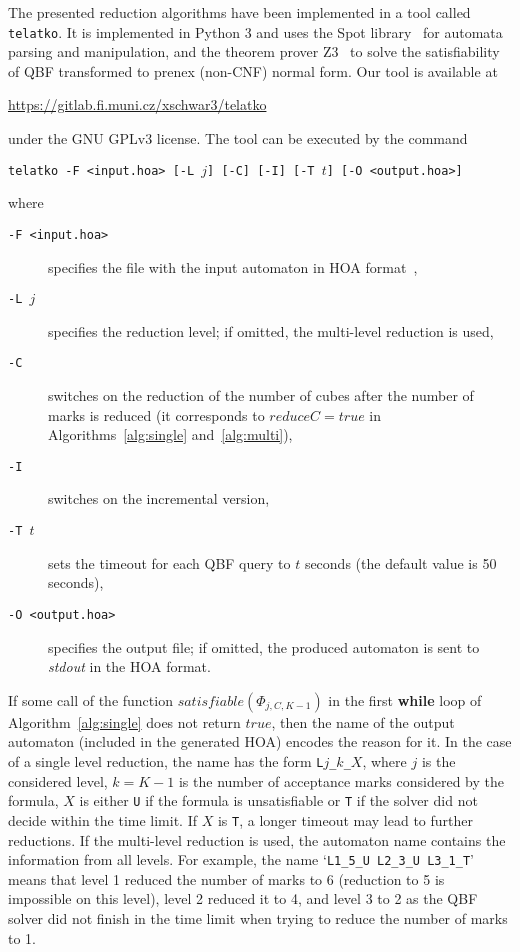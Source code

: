 \documentclass[a4paper,UKenglish,cleveref,autoref,thm-restate]{lipics-v2021}
\def\true{\mathit{true}}
\newcommand{\telatko}{\texttt{telatko}\xspace}
\begin{document}
The presented reduction algorithms have been implemented in a tool
called \telatko. It is implemented in Python 3 and uses the Spot
library~\cite{duret.16.atva2} for automata parsing and manipulation,
and the theorem prover Z3~\cite{demoura.08.tacas} to solve the
satisfiability of QBF transformed to prenex (non-CNF) normal form. Our
tool is available at
\begin{center}
\url{https://gitlab.fi.muni.cz/xschwar3/telatko}
\end{center}
under the GNU GPLv3
license. The tool can be executed by the command 
\begin{center}
  \texttt{telatko -F <input.hoa> [-L }$j$\texttt{] [-C] [-I] [-T }$t$\texttt{] [-O <output.hoa>]}
\end{center}
where
\begin{description}
\item[\texttt{-F <input.hoa>}] specifies the file with the input automaton in HOA format~\cite{babiak.15.cav}, 
\item[\texttt{-L }$j$] specifies the reduction level; if omitted, the multi-level reduction is used,
\item[\texttt{-C}] switches on the reduction of the number of cubes
  after the number of marks is reduced (it corresponds to
  $\mathit{reduceC}=\true$ in Algorithms~\ref{alg:single}
  and~\ref{alg:multi}),
\item[\texttt{-I}] switches on the incremental version,
\item[\texttt{-T }$t$] sets the timeout for each QBF query to $t$ seconds (the default value is 50 seconds), 
\item[\texttt{-O <output.hoa>}] specifies the output file; if omitted,
  the produced automaton is sent to \textit{stdout} in the HOA format.
\end{description}

If some call of the function $\mathit{satisfiable}(\Phi_{j,C,K{-}1})$
in the first \textbf{while} loop of Algorithm~\ref{alg:single} does
not return $\true$, then the name of the output automaton (included in
the generated HOA) encodes the reason for it. In the case of a single
level reduction, the name has the form \texttt{L$j$\_$k$\_$X$}, where
$j$ is the considered level, $k=K-1$ is the number of acceptance marks
considered by the formula, $X$ is either \texttt{U} if the formula is
unsatisfiable or \texttt{T} if the solver did not decide within the
time limit. If $X$ is \texttt{T}, a longer timeout may lead to further
reductions. If the multi-level reduction is used, the automaton name
contains the information from all levels. For example, the name
`\texttt{L1\_5\_U L2\_3\_U L3\_1\_T}' means that level 1 reduced the
number of marks to 6 (reduction to 5 is impossible on this level),
level 2 reduced it to 4, and level 3 to 2 as the QBF solver did not
finish in the time limit when trying to reduce the number of marks to
1.
\end{document}
